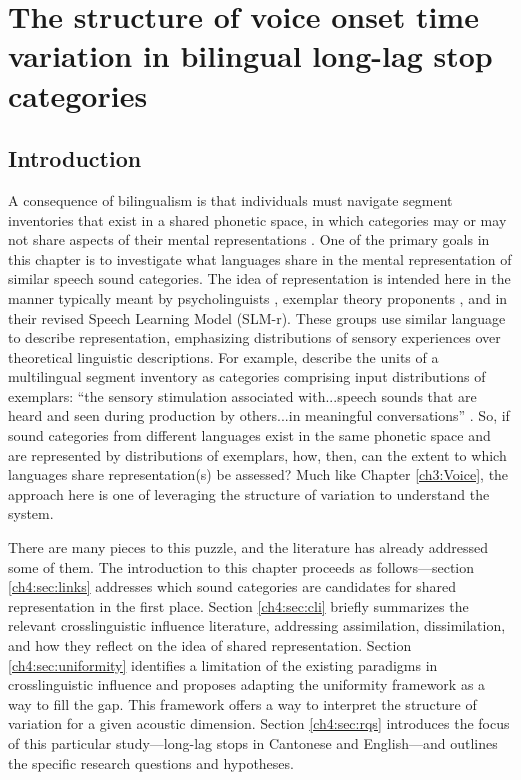 \setcounter{chapter}{3}

\chapter{The structure of voice onset time variation in bilingual long-lag stop categories}\label{Uniformity}

\section{Introduction}\label{ch4:sec:intro}

A consequence of bilingualism is that individuals must navigate segment inventories that exist in a shared phonetic space, in which categories may or may not share aspects of their mental representations \citep{flege_2021_slmr}. One of the primary goals in this chapter is to investigate what languages share in the mental representation of similar speech sound categories. The idea of representation is intended here in the manner typically meant by psycholinguists \citep[e.g.,][]{llompart_2018_acoustic}, exemplar theory proponents \citep[e.g.,][]{amengual_2018_laterals}, and \citet{flege_2021_slmr} in their revised Speech Learning Model (SLM-r). These groups use similar language to describe representation, emphasizing distributions of sensory experiences over theoretical linguistic descriptions. For example, \citeauthor{flege_2021_slmr} describe the units of a multilingual segment inventory as categories comprising input distributions of exemplars: ``the sensory stimulation associated with...speech sounds that are heard and seen during production by others...in meaningful conversations'' \citep[][p. 32]{flege_2021_slmr}. So, if sound categories from different languages exist in the same phonetic space and are represented by distributions of exemplars, how, then, can the extent to which languages share representation(s) be assessed? Much like Chapter \ref{ch3:Voice}, the approach here is one of leveraging the structure of variation to understand the system. 

There are many pieces to this puzzle, and the literature has already addressed some of them. The introduction to this chapter proceeds as follows---section \ref{ch4:sec:links} addresses which sound categories are candidates for shared representation in the first place. Section \ref{ch4:sec:cli} briefly summarizes the relevant crosslinguistic influence literature, addressing assimilation, dissimilation, and how they reflect on the idea of shared representation. Section \ref{ch4:sec:uniformity} identifies a limitation of the existing paradigms in crosslinguistic influence and proposes adapting the uniformity framework as a way to fill the gap. This framework offers a way to interpret the structure of variation for a given acoustic dimension. Section \ref{ch4:sec:rqs} introduces the focus of this particular study---long-lag stops in Cantonese and English---and outlines the specific research questions and hypotheses.

